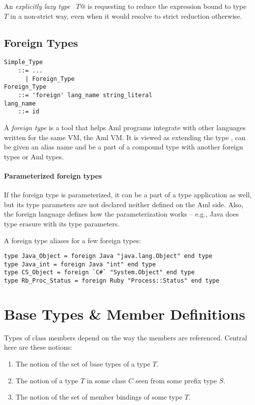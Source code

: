 An {\em explicitly lazy type} \lstinline@~$T$@ is requesting \Aml to reduce the expression bound to type $T$ in a non-strict way, even when it would resolve to strict reduction otherwise.





\subsection{Foreign Types}
\label{sec:foreign-types}

\grammar\begin{lstlisting}
Simple_Type 
    ::= ...
      | Foreign_Type
Foreign_Type 
    ::= 'foreign' lang_name string_literal
lang_name 
    ::= id
\end{lstlisting}

A {\em foreign type} is a tool that helps Aml programs integrate with other languages written for the same VM, the Aml VM. It is viewed as extending the type , can be given an alias name and be a part of a compound type with another foreign types or Aml types. 

\paragraph{Parameterized foreign types}
If the foreign type is parameterized, it can be a part of a type application as well, but its type parameters are not declared neither defined on the Aml side. Also, the foreign language defines how the parameterization works -- e.g., Java does type erasure with its type parameters.

\example A foreign type aliases for a few foreign types:
\begin{lstlisting}
type Java_Object = foreign Java "java.lang.Object" end type
type Java_int = foreign Java "int" end type
type CS_Object = foreign `C#` "System.Object" end type
type Rb_Proc_Status = foreign Ruby "Process::Status" end type
\end{lstlisting}






\section{Base Types \& Member Definitions}
\label{sec:base-types}
\label{sec:member-definitions}

Types of class members depend on the way the members are referenced. Central here are these notions:
\begin{enumerate}
  \item The notion of the set of base types of a type $T$.
  \item The notion of a type $T$ in some class $C$ seen from some prefix type $S$.
  \item The notion of the set of member bindings of some type $T$. 
\end{enumerate}


